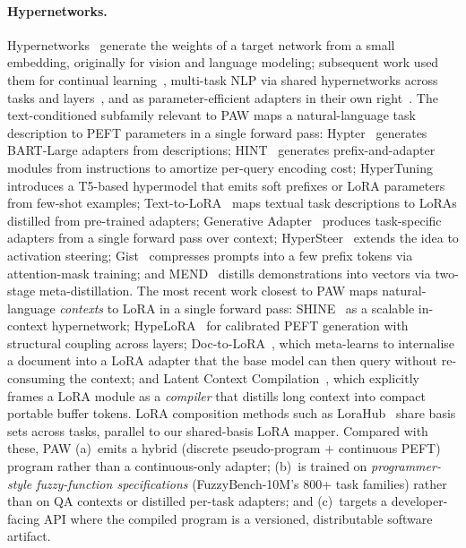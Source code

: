 \documentclass{article}
\theoremstyle{plain}
\theoremstyle{definition}
\theoremstyle{remark}
\begin{document}
\paragraph{Hypernetworks.}
Hypernetworks~\citep{ha2017hypernetworks} generate the weights of a target network from a small embedding, originally for vision and language modeling; subsequent work used them for continual learning~\citep{ohs2019hypercl}, multi-task NLP via shared hypernetworks across tasks and layers~\citep{karimi-mahabadi-etal-2021-parameter}, and as parameter-efficient adapters in their own right~\citep{mahabadi2021compacter}. The text-conditioned subfamily relevant to PAW maps a natural-language task description to PEFT parameters in a single forward pass: Hypter~\citep{ye-ren-2021-hypter} generates BART-Large adapters from descriptions; HINT~\citep{ivison-etal-2023-hint} generates prefix-and-adapter modules from instructions to amortize per-query encoding cost; HyperTuning~\citep{phang2023hypertuning} introduces a T5-based hypermodel that emits soft prefixes or LoRA parameters from few-shot examples; Text-to-LoRA~\citep{charakorn2025texttolora} maps textual task descriptions to LoRAs distilled from pre-trained adapters; Generative Adapter~\citep{chen2025generative} produces task-specific adapters from a single forward pass over context; HyperSteer~\citep{sun2025hypersteeractivationsteeringscale} extends the idea to activation steering; Gist~\citep{mu2023gist} compresses prompts into a few prefix tokens via attention-mask training; and MEND~\citep{li2024mend} distills demonstrations into vectors via two-stage meta-distillation. The most recent work closest to PAW maps natural-language \emph{contexts} to LoRA in a single forward pass: SHINE~\citep{shine2026} as a scalable in-context hypernetwork; HypeLoRA~\citep{hypelora2026} for calibrated PEFT generation with structural coupling across layers; Doc-to-LoRA~\citep{doctolora2026}, which meta-learns to internalise a document into a LoRA adapter that the base model can then query without re-consuming the context; and Latent Context Compilation~\citep{latentcompilation2026}, which explicitly frames a LoRA module as a \emph{compiler} that distills long context into compact portable buffer tokens. LoRA composition methods such as LoraHub~\citep{huang2024lorahub} share basis sets across tasks, parallel to our shared-basis LoRA mapper. Compared with these, PAW (a)~emits a hybrid (discrete pseudo-program $+$ continuous PEFT) program rather than a continuous-only adapter; (b)~is trained on \emph{programmer-style fuzzy-function specifications} (FuzzyBench-10M's 800+ task families) rather than on QA contexts or distilled per-task adapters; and (c)~targets a developer-facing API where the compiled program is a versioned, distributable software artifact. %
\end{document}
